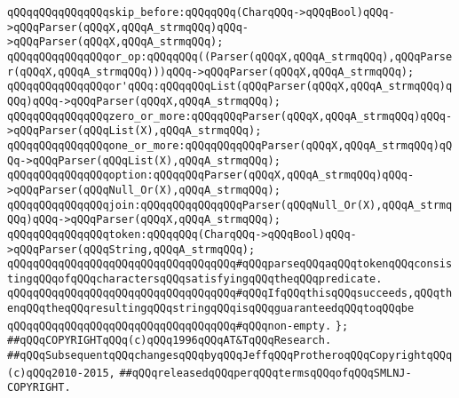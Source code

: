 \newline
\verb|qQQqqQQqqQQqqQQqskip_before:qQQqqQQq(CharqQQq->qQQqBool)qQQq->qQQqParser(qQQqX,qQQqA_strmqQQq)qQQq->qQQqParser(qQQqX,qQQqA_strmqQQq);|\newline
\newline
\verb|qQQqqQQqqQQqqQQqor_op:qQQqqQQq((Parser(qQQqX,qQQqA_strmqQQq),qQQqParser(qQQqX,qQQqA_strmqQQq)))qQQq->qQQqParser(qQQqX,qQQqA_strmqQQq);|\newline
\verb|qQQqqQQqqQQqqQQqor'qQQq:qQQqqQQqList(qQQqParser(qQQqX,qQQqA_strmqQQq)qQQq)qQQq->qQQqParser(qQQqX,qQQqA_strmqQQq);|\newline
\newline
\verb|qQQqqQQqqQQqqQQqzero_or_more:qQQqqQQqParser(qQQqX,qQQqA_strmqQQq)qQQq->qQQqParser(qQQqList(X),qQQqA_strmqQQq);|\newline
\verb|qQQqqQQqqQQqqQQqone_or_more:qQQqqQQqqQQqParser(qQQqX,qQQqA_strmqQQq)qQQq->qQQqParser(qQQqList(X),qQQqA_strmqQQq);|\newline
\newline
\verb|qQQqqQQqqQQqqQQqoption:qQQqqQQqParser(qQQqX,qQQqA_strmqQQq)qQQq->qQQqParser(qQQqNull_Or(X),qQQqA_strmqQQq);|\newline
\verb|qQQqqQQqqQQqqQQqjoin:qQQqqQQqqQQqqQQqParser(qQQqNull_Or(X),qQQqA_strmqQQq)qQQq->qQQqParser(qQQqX,qQQqA_strmqQQq);|\newline
\newline
\verb|qQQqqQQqqQQqqQQqtoken:qQQqqQQq(CharqQQq->qQQqBool)qQQq->qQQqParser(qQQqString,qQQqA_strmqQQq);|\newline
\verb|qQQqqQQqqQQqqQQqqQQqqQQqqQQqqQQqqQQq#qQQqparseqQQqaqQQqtokenqQQqconsistingqQQqofqQQqcharactersqQQqsatisfyingqQQqtheqQQqpredicate.|\newline
\verb|qQQqqQQqqQQqqQQqqQQqqQQqqQQqqQQqqQQq#qQQqIfqQQqthisqQQqsucceeds,qQQqthenqQQqtheqQQqresultingqQQqstringqQQqisqQQqguaranteedqQQqtoqQQqbe|\newline
\verb|qQQqqQQqqQQqqQQqqQQqqQQqqQQqqQQqqQQq#qQQqnon-empty.|\newline
\newline
\verb|};|\newline
\newline
\newline
\verb|##qQQqCOPYRIGHTqQQq(c)qQQq1996qQQqAT&TqQQqResearch.|\newline
\verb|##qQQqSubsequentqQQqchangesqQQqbyqQQqJeffqQQqProtheroqQQqCopyrightqQQq(c)qQQq2010-2015,|\newline
\verb|##qQQqreleasedqQQqperqQQqtermsqQQqofqQQqSMLNJ-COPYRIGHT.|\newline

